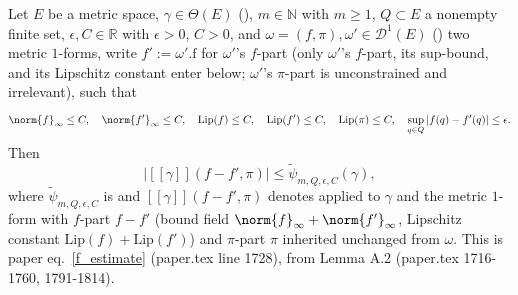 \begin{lemma}
  Let $E$ be a metric space, $\gamma \in \Theta(E)$ (), $m \in \mathbb{N}$ with
  $m \ge 1$, $Q \subset E$ a nonempty finite set, $\epsilon,C \in \mathbb{R}$ with $\epsilon>0$,
  $C>0$, and $\omega=(f,\pi), \omega' \in \mathcal{D}^1(E)$ () two metric $1$-forms,
  write $f' := \omega'.\mathrm{f}$ for $\omega'$'s $f$-part (only $\omega'$'s $f$-part, its
  sup-bound, and its Lipschitz constant enter below; $\omega'$'s $\pi$-part is unconstrained and
  irrelevant), such that
  \[
    \norm{f}_\infty \le C, \quad \norm{f'}_\infty \le C, \quad \mathrm{Lip}(f) \le C, \quad
    \mathrm{Lip}(f') \le C, \quad \mathrm{Lip}(\pi) \le C, \quad
    \sup_{q \in Q} |f(q)-f'(q)| \le \epsilon
    .
  \]
  Then
  \[
    \bigl| [[\gamma]](f-f',\pi) \bigr| \le \tilde\psi_{m,Q,\epsilon,C}(\gamma)
    ,
  \]
  where $\tilde\psi_{m,Q,\epsilon,C}$ is  and $[[\gamma]](f-f',\pi)$ denotes
   applied to $\gamma$ and the metric $1$-form with $f$-part $f-f'$
  (bound field $\norm{f}_\infty+\norm{f'}_\infty$, Lipschitz constant
  $\mathrm{Lip}(f)+\mathrm{Lip}(f')$) and $\pi$-part $\pi$ inherited unchanged from $\omega$. This
  is paper eq.~\eqref{f_estimate} (paper.tex line 1728), from Lemma A.2 (paper.tex 1716-1760,
  1791-1814).


\end{lemma}
